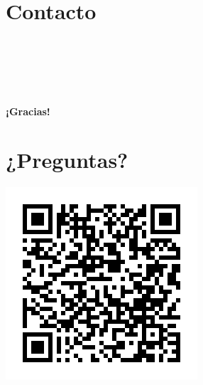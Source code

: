 \documentclass{presentacion}
\begin{document}
\section{Contacto}
\begin{frame}
    \begin{center}
        \vspace{1em}
        \\
        \vspace{0.5em}
        \\
        \vspace{0.5em}
        \\
        \vspace{0.5em}
        \\
        \vspace{1em}
        
        \large\textbf{¡Gracias!}
    \end{center}
\end{frame}

\section{¿Preguntas?}
\begin{frame}
    \centering
    \includegraphics[height=0.8\textheight]{img/qr-code}
\end{frame}
\end{document}
